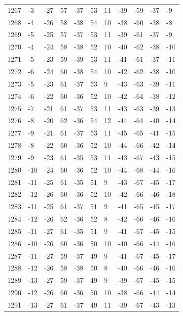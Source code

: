 \begin{table}[H]
\begin{tabular}{lllllllllll}
1267 & -3 & -27 & 57 & -37 & 53 & 11 & -39 & -59 & -37 & -9 \\
1268 & -4 & -26 & 58 & -38 & 54 & 10 & -38 & -60 & -38 & -8 \\
1269 & -5 & -25 & 57 & -37 & 53 & 11 & -39 & -61 & -37 & -9 \\
1270 & -4 & -24 & 58 & -38 & 52 & 10 & -40 & -62 & -38 & -10 \\
1271 & -5 & -23 & 59 & -39 & 53 & 11 & -41 & -61 & -37 & -11 \\
1272 & -6 & -24 & 60 & -38 & 54 & 10 & -42 & -62 & -38 & -10 \\
1273 & -5 & -23 & 61 & -37 & 53 & 9 & -43 & -63 & -39 & -11 \\
1274 & -6 & -22 & 60 & -36 & 52 & 10 & -42 & -64 & -38 & -12 \\
1275 & -7 & -21 & 61 & -37 & 53 & 11 & -43 & -63 & -39 & -13 \\
1276 & -8 & -20 & 62 & -36 & 54 & 12 & -44 & -64 & -40 & -14 \\
1277 & -9 & -21 & 61 & -37 & 53 & 11 & -45 & -65 & -41 & -15 \\
1278 & -8 & -22 & 60 & -36 & 52 & 10 & -44 & -66 & -42 & -14 \\
1279 & -9 & -23 & 61 & -35 & 53 & 11 & -43 & -67 & -43 & -15 \\
1280 & -10 & -24 & 60 & -36 & 52 & 10 & -44 & -68 & -44 & -16 \\
1281 & -11 & -25 & 61 & -35 & 51 & 9 & -43 & -67 & -45 & -17 \\
1282 & -12 & -26 & 60 & -36 & 52 & 10 & -42 & -66 & -46 & -18 \\
1283 & -11 & -25 & 61 & -37 & 51 & 9 & -41 & -65 & -45 & -17 \\
1284 & -12 & -26 & 62 & -36 & 52 & 8 & -42 & -66 & -46 & -16 \\
1285 & -11 & -27 & 61 & -35 & 51 & 9 & -41 & -67 & -45 & -15 \\
1286 & -10 & -26 & 60 & -36 & 50 & 10 & -40 & -66 & -44 & -16 \\
1287 & -11 & -27 & 59 & -37 & 49 & 9 & -41 & -67 & -45 & -17 \\
1288 & -12 & -26 & 58 & -38 & 50 & 8 & -40 & -66 & -46 & -16 \\
1289 & -13 & -27 & 59 & -37 & 49 & 9 & -39 & -67 & -45 & -15 \\
1290 & -12 & -26 & 60 & -36 & 50 & 10 & -38 & -66 & -44 & -14 \\
1291 & -13 & -27 & 61 & -37 & 49 & 11 & -39 & -67 & -43 & -13 \\

\end{tabular}
\end{table}
